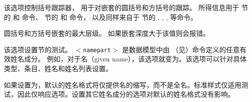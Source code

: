 \begin{optionlist}


该选项控制括号跟踪器，
用于对嵌套的圆括号和方括号的跟踪。
所得信息用于  节的   和  命令、
 节的  和  命令，
以及同样来自于  节的 , , ,  等命令。



圆括号和方括号嵌套的最大层级。
如果嵌套深度大于该值则会报错。



该选项设置节的测试。
\texttt{$<$namepart$>$} 是数据模型中由
（见）命令定义的任意有效姓名成分。
例如，对于名（given name），该选项就变为。该选项可以针对具体类型、条目、姓名和姓名列表设置。


如果设置为，默认的姓名格式将仅提供名的缩写，而不是全名。标准样式仅适用测试，因此仅响应选项。设置其它姓名成分的选项对默认的姓名格式没有影响。



\end{optionlist}
